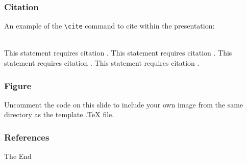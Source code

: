 \documentclass[usenames,dvipsnames,aspectratio=169,serif]{beamer}
\begin{document}
\begin{frame}[fragile] %
\frametitle{Citation}
An example of the \verb|\cite| command to cite within the presentation:\\~

This statement requires citation \cite{FAA-ConOps-v2}.
This statement requires citation \cite{EASA-UAS-ATM-Assessment-2018}.
This statement requires citation \cite{RPASGM2020}.
This statement requires citation \cite{FAA-NPRM-2019-1100}.
\end{frame}


\begin{frame}
\frametitle{Figure}
Uncomment the code on this slide to include your own image from the same directory as the template .TeX file.
\end{frame}


\begin{frame}[t, allowframebreaks]
  \frametitle{References}
  
  
\end{frame}


\begin{frame}
\Huge{\centerline{The End}}
\end{frame}

\end{document}
